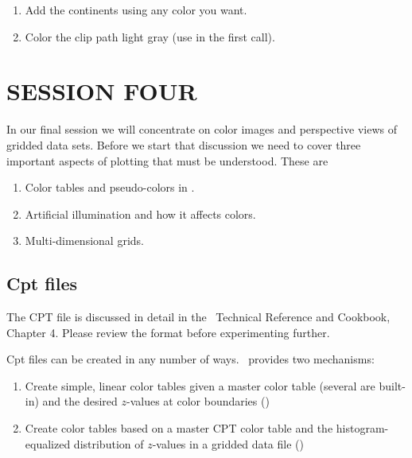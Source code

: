 \documentclass[11pt]{report}
\begin{document}
\begin{enumerate}

\item Add the continents using any color you want.

\item Color the clip path light gray (use  in the first
 call).

\end{enumerate}

\chapter{SESSION FOUR}

In our final session we will concentrate on color images and
perspective views of gridded data sets.  Before we start that
discussion we need to cover three important aspects of plotting
that must be understood.  These are

\begin{enumerate}
\item Color tables and pseudo-colors in \GMT.
\item Artificial illumination and how it affects colors.
\item Multi-dimensional grids.
\end{enumerate}

\section{Cpt files}

The CPT file is discussed in detail in the \GMT\ Technical Reference
and Cookbook, Chapter 4.  Please review the format before experimenting
further.


Cpt files can be created in any number of ways.  \GMT\ provides
two mechanisms:\

\begin{enumerate}

\item Create simple, linear color tables given a master color table
(several are built-in) and the desired $z$-values at color boundaries
()

\item Create color tables based on a master CPT color table and the
histogram-equalized distribution of $z$-values in a gridded data file ()

\end{enumerate}
\end{document}
